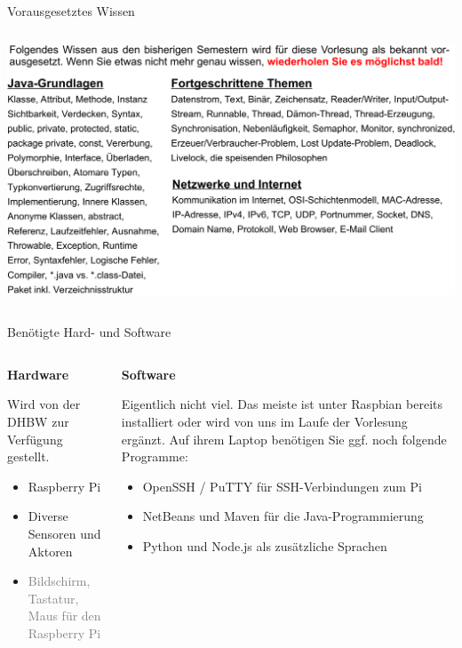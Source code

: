 \begin{frame}{Vorausgesetztes Wissen}
    \begin{columns}
        \column{\dimexpr\paperwidth-10pt}
        \includegraphics[width=\textwidth]{1-grundlagen/img/vorausgesetztes_wissen}
    \end{columns}
\end{frame}


\begin{frame}{Benötigte Hard- und Software}
        \begin{columns}
            \begin{column}[T]{.5\textwidth}
                \textbf{Hardware}
                \medskip

                Wird von der DHBW zur Verfügung gestellt. %
                \medskip

                \begin{itemize}
                    \item Raspberry Pi
                    \item Diverse Sensoren und Aktoren
                    \item \textcolor{gray}{Bildschirm, Tastatur, Maus für den Raspberry Pi}
                \end{itemize}
            \end{column}
            \begin{column}[T]{.5\textwidth}
                \textbf{Software}
                \medskip

                Eigentlich nicht viel. Das meiste ist unter Raspbian bereits
                installiert oder wird von uns im Laufe der Vorlesung ergänzt.
                Auf ihrem Laptop benötigen Sie ggf. noch folgende Programme:
                \medskip

                \begin{itemize}
                    \item OpenSSH / PuTTY für SSH-Verbindungen zum Pi
                    \item NetBeans und Maven für die Java-Programmierung
                    \item Python und Node.js als zusätzliche Sprachen
                \end{itemize}
            \end{column}
        \end{columns}
\end{frame}

